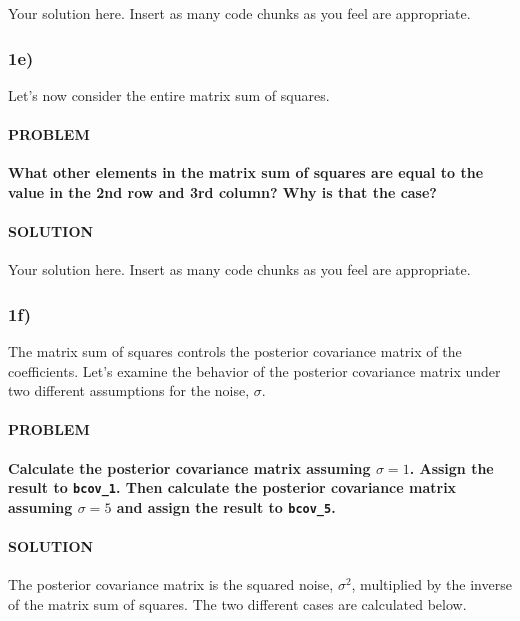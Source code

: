 \documentclass[
]{article}
\begin{document}
Your solution here. Insert as many code chunks as you feel are
appropriate.

\hypertarget{e}{%
\subsubsection{1e)}\label{e}}

Let's now consider the entire matrix sum of squares.

\hypertarget{problem-4}{%
\paragraph{PROBLEM}\label{problem-4}}

\textbf{What other elements in the matrix sum of squares are equal to
the value in the 2nd row and 3rd column? Why is that the case?}

\hypertarget{solution-4}{%
\paragraph{SOLUTION}\label{solution-4}}

Your solution here. Insert as many code chunks as you feel are
appropriate.

\hypertarget{f}{%
\subsubsection{1f)}\label{f}}

The matrix sum of squares controls the posterior covariance matrix of
the coefficients. Let's examine the behavior of the posterior covariance
matrix under two different assumptions for the noise, \(\sigma\).

\hypertarget{problem-5}{%
\paragraph{PROBLEM}\label{problem-5}}

\textbf{Calculate the posterior covariance matrix assuming \(\sigma=1\).
Assign the result to \texttt{bcov\_1}. Then calculate the posterior
covariance matrix assuming \(\sigma=5\) and assign the result to
\texttt{bcov\_5}.}

\hypertarget{solution-5}{%
\paragraph{SOLUTION}\label{solution-5}}

The posterior covariance matrix is the squared noise, \(\sigma^2\),
multiplied by the inverse of the matrix sum of squares. The two
different cases are calculated below.
\end{document}
